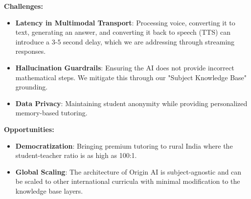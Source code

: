 \textbf{Challenges:}
\begin{itemize}
    \item \textbf{Latency in Multimodal Transport}: Processing voice, converting it to text, generating an answer, and converting it back to speech (TTS) can introduce a 3-5 second delay, which we are addressing through streaming responses.
    \item \textbf{Hallucination Guardrails}: Ensuring the AI does not provide incorrect mathematical steps. We mitigate this through our "Subject Knowledge Base" grounding.
    \item \textbf{Data Privacy}: Maintaining student anonymity while providing personalized memory-based tutoring.
\end{itemize}

\textbf{Opportunities:}
\begin{itemize}
    \item \textbf{Democratization}: Bringing premium tutoring to rural India where the student-teacher ratio is as high as 100:1.
    \item \textbf{Global Scaling}: The architecture of Origin AI is subject-agnostic and can be scaled to other international curricula with minimal modification to the knowledge base layers.
\end{itemize}

